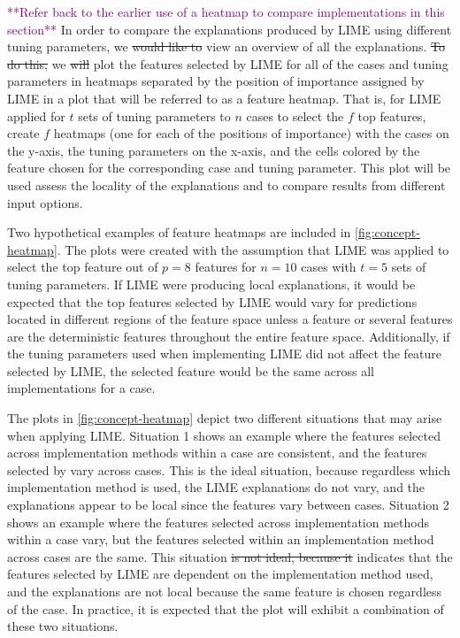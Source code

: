 \documentclass[AMS,STIX2COL]{WileyNJD-v2}\usepackage[]{graphicx}\usepackage[]{color}
\newcommand{\kgc}[1]{\textcolor{purple}{#1}}
\begin{document}
{\kgc{**Refer back to the earlier use of a heatmap to compare implementations in this section**} In order to compare the explanations produced by LIME using different tuning parameters, we \sout{would like to} view an overview of all the explanations.
\sout{To do this,} we \sout{will} plot the features selected by LIME for all of the cases and tuning parameters in heatmaps separated by the position of importance assigned by LIME in a plot that will be referred to as a feature heatmap. That is, for LIME applied for $t$ sets of tuning parameters to $n$ cases to select the $f$ top features, create $f$ heatmaps (one for each of the positions of importance) with the cases on the y-axis, the tuning parameters on the x-axis, and the cells colored by the feature chosen for the corresponding case and tuning parameter. This plot will be used assess the locality of the explanations and to compare results from different input options.

Two hypothetical examples of feature heatmaps are included in \autoref{fig:concept-heatmap}. The plots were created with the assumption that LIME was applied to select the top feature out of $p=8$ features for $n=10$ cases with $t=5$ sets of tuning parameters. If LIME were producing local explanations, it would be expected that the top features selected by LIME would vary for predictions located in different regions of the feature space unless a feature or several features are the deterministic features throughout the entire feature space. Additionally, if the tuning parameters used when implementing LIME did not affect the feature selected by LIME, the selected feature would be the same across all implementations for a case.

The plots in \autoref{fig:concept-heatmap} depict two different situations that may arise when applying LIME. Situation 1 shows an example where the features selected across implementation methods within a case are consistent, and the features selected by vary across cases. This is the ideal situation, because regardless which implementation method is used, the LIME explanations do not vary, and the explanations appear to be local since the features vary between cases. Situation 2 shows an example where the features selected across implementation methods within a case vary, but the features selected within an implementation method across cases are the same. This situation \sout{is not ideal, because it} indicates that the features selected by LIME are dependent on the implementation method used, and the explanations are not local because the same feature is chosen regardless of the case. In practice, it is expected that the plot will exhibit a combination of these two situations.

}
\end{document}
